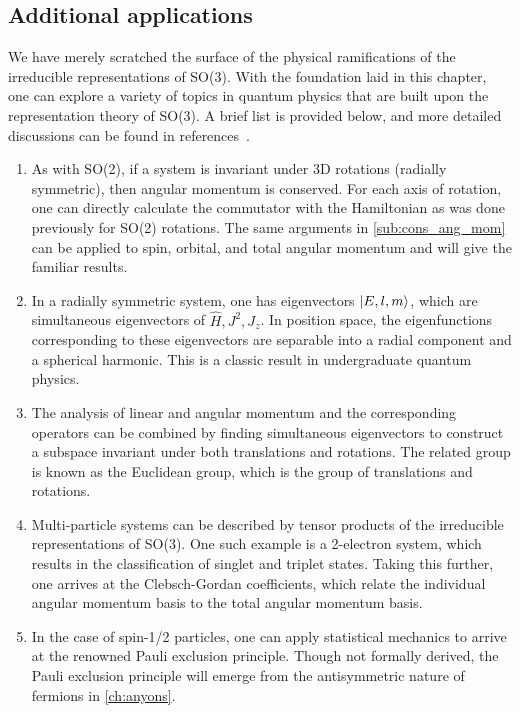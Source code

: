 \subsection{Additional applications}
We have merely scratched the surface of the physical ramifications of the irreducible representations of SO(3). With the foundation laid in this chapter, one can explore a variety of topics in quantum physics that are built upon the representation theory of SO(3). A brief list is provided below, and more detailed discussions can be found in references~\cite{Griffiths2018,Hall2013,Tung1985}.
\begin{enumerate}
    \item As with SO(2), if a system is invariant under 3D rotations (radially symmetric), then angular momentum is conserved. For each axis of rotation, one can directly calculate the commutator with the Hamiltonian as was done previously for SO(2) rotations. The same arguments in \cref{sub:cons_ang_mom} can be applied to spin, orbital, and total angular momentum and will give the familiar results.
    \item In a radially symmetric system, one has eigenvectors $\ket{E,l,m}$, which are simultaneous eigenvectors of $\hat{H},J^2,J_z$. In position space, the eigenfunctions corresponding to these eigenvectors are separable into a radial component and a spherical harmonic. This is a classic result in undergraduate quantum physics.
    \item The analysis of linear and angular momentum and the corresponding operators can be combined by finding simultaneous eigenvectors to construct a subspace invariant under both translations and rotations. The related group is known as the Euclidean group, which is the group of translations and rotations.
    \item Multi-particle systems can be described by tensor products of the irreducible representations of SO(3). One such example is a 2-electron system, which results in the classification of singlet and triplet states. Taking this further, one arrives at the Clebsch-Gordan coefficients, which relate the individual angular momentum basis to the total angular momentum basis.
    \item In the case of spin-1/2 particles, one can apply statistical mechanics to arrive at the renowned Pauli exclusion principle. Though not formally derived, the Pauli exclusion principle will emerge from the antisymmetric nature of fermions in \cref{ch:anyons}.
\end{enumerate}

